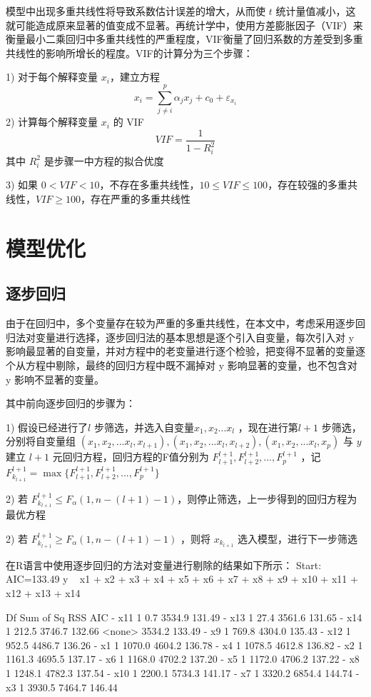 \documentclass [a4paper]{article}
\begin{document}
模型中出现多重共线性将导致系数估计误差的增大，从而使 $t$ 统计量值减小，这就可能造成原来显著的值变成不显著。再统计学中，使用方差膨胀因子（VIF）来衡量最小二乘回归中多重共线性的严重程度，VIF衡量了回归系数的方差受到多重共线性的影响所增长的程度。VIF的计算分为三个步骤：

1) 对于每个解释变量 $x_i$，建立方程
$$
x_i = \sum_{j \ne i}^p \alpha_jx_j+c_0 +\varepsilon_{x_i}
$$
2) 计算每个解释变量 $x_i$ 的 VIF
$$
VIF = \frac{1}{1-R^2_i}
$$
其中 $R_i^2$ 是步骤一中方程的拟合优度

3)  如果 $0<VIF<10$，不存在多重共线性，$10 \le VIF \le 100$，存在较强的多重共线性，$VIF \ge 100$，存在严重的多重共线性

\section{模型优化}

\subsection{逐步回归}
由于在回归中，多个变量存在较为严重的多重共线性，在本文中，考虑采用逐步回归法对变量进行选择，逐步回归法的基本思想是逐个引入自变量，每次引入对 y 影响最显著的自变量，并对方程中的老变量进行逐个检验，把变得不显著的变量逐个从方程中剔除，最终的回归方程中既不漏掉对 y 影响显著的变量，也不包含对 y 影响不显著的变量。

其中前向逐步回归的步骤为：

1) 假设已经进行了$l$ 步筛选，并选入自变量$x_1,x_2...x_l$ ，现在进行第$l+1$ 步筛选，分别将自变量组 $(x_1,x_2,...x_l,x_{l+1}),(x_1,x_2,...x_l,x_{l+2}),(x_1,x_2,...x_l,x_{p})$ 与 $y$ 建立 $l+1$ 元回归方程，回归方程的F值分别为 ${F_{l+1}^{l+1},F_{l+2}^{l+1},...,F_p^{l+1}}$ ，记$F_{k_{l+1}}^{l+1} = \max\{ F_{l+1}^{l+1},F_{l+2}^{l+1},...,F_p^{l+1}\}$

2) 若 $F_{k_{l+1}}^{l+1} \le F_\alpha(1,n-(l+1)-1)$，则停止筛选，上一步得到的回归方程为最优方程

2) 若 $F_{k_{l+1}}^{l+1} \ge F_\alpha(1,n-(l+1)-1)$ ，则将 $x_{k_{l+1}}$ 选入模型，进行下一步筛选

在R语言中使用逐步回归的方法对变量进行剔除的结果如下所示：
Start:  AIC=133.49
y ~ x1 + x2 + x3 + x4 + x5 + x6 + x7 + x8 + x9 + x10 + x11 +
    x12 + x13 + x14

       Df Sum of Sq    RSS    AIC
- x11   1       0.7 3534.9 131.49
- x13   1      27.4 3561.6 131.65
- x14   1     212.5 3746.7 132.66
<none>              3534.2 133.49
- x9    1     769.8 4304.0 135.43
- x12   1     952.5 4486.7 136.26
- x1    1    1070.0 4604.2 136.78
- x4    1    1078.5 4612.8 136.82
- x2    1    1161.3 4695.5 137.17
- x6    1    1168.0 4702.2 137.20
- x5    1    1172.0 4706.2 137.22
- x8    1    1248.1 4782.3 137.54
- x10   1    2200.1 5734.3 141.17
- x7    1    3320.2 6854.4 144.74
- x3    1    3930.5 7464.7 146.44
\end{document}
